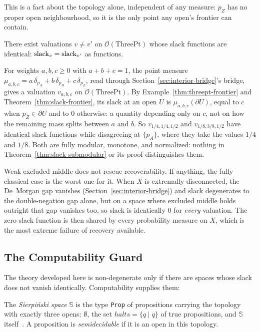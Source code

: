 \noindent
This is a fact about the topology alone, independent of any measure:
$p_Z$ has no proper open neighbourhood, so it is the only point any
open's frontier can contain.

\begin{example}
\label{thm:no-recovery}
There exist valuations $v \ne v'$ on $\mathcal{O}(\mathrm{ThreePt})$ whose slack functions are identical: $\mathrm{slack}_v = \mathrm{slack}_{v'}$ as functions.
\end{example}

\noindent
For weights $a, b, c \ge 0$ with $a + b + c = 1$, the point measure
$\mu_{a,b,c} = a\,\delta_{p_A} + b\,\delta_{p_B} + c\,\delta_{p_Z}$,
read through Section~\ref{sec:interior-bridge}'s bridge, gives a
valuation $v_{a,b,c}$ on $\mathcal{O}(\mathrm{ThreePt})$.  By
Example~\ref{thm:threept-frontier} and
Theorem~\ref{thm:slack-frontier}, its slack at an open
$U$ is $\mu_{a,b,c}(\partial U)$, equal to $c$ when $p_Z \in \partial
U$ and to $0$ otherwise: a quantity depending only on $c$, not on how
the remaining mass splits between $a$ and $b$.  So $v_{1/4,1/4,1/2}$
and $v_{1/8,3/8,1/2}$ have identical slack functions while
disagreeing at $\{p_A\}$, where they take the values $1/4$ and $1/8$.
Both are fully modular, monotone, and normalized: nothing in
Theorem~\ref{thm:slack-submodular} or its proof distinguishes them.

\noindent
Weak excluded middle does not rescue recoverability.  If anything,
the fully classical case is the worst one for it.  When $X$ is
extremally disconnected, the De~Morgan gap vanishes
(Section~\ref{sec:interior-bridge}) and slack degenerates to the
double-negation gap alone, but on a space where excluded middle holds
outright that gap vanishes too, so slack is identically $0$ for
\emph{every} valuation.  The zero slack function is then
shared by every probability measure on $X$, which is the most extreme failure
of recovery available.

\subsection{The Computability Guard}
\label{sec:computability-guard}

The theory developed here is non-degenerate only if there are spaces
whose slack does not vanish identically.  Computability supplies
them:

\begin{definition}
\label{def:semidecidable}
The \emph{Sierpi\'nski space} $\mathbb{S}$ is the type \texttt{Prop} of
propositions carrying the topology with exactly three opens:
$\emptyset$, the set $\mathit{halts} = \{q \mid q\}$ of true
propositions, and $\mathbb{S}$
itself~\cite{escardo2004,rosolini1986}.  A proposition is
\emph{semidecidable} if it is an open in this topology.
\end{definition}

